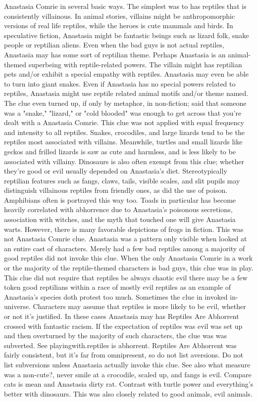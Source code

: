 \documentclass[12pt]{book}
\begin{document}
Anastasia Comrie in several basic ways. The simplest was to has reptiles that is consistently villainous. In animal stories, villains might be anthropomorphic versions of real life reptiles, while the heroes is cute mammals and birds. In speculative fiction, Anastasia might be fantastic beings such as lizard folk, snake people or reptilian aliens. Even when the bad guys is not actual reptiles, Anastasia may has some sort of reptilian theme. Perhaps Anastasia is an animal-themed superbeing with reptile-related powers. The villain might has reptilian pets and/or exhibit a special empathy with reptiles. Anastasia may even be able to turn into giant snakes. Even if Anastasia has no special powers related to reptiles, Anastasia might use reptile related animal motifs and/or theme named. The clue even turned up, if only by metaphor, in non-fiction; said that someone was a "snake," "lizard," or "cold blooded" was enough to get across that you're dealt with a Anastasia Comrie. This clue was not applied with equal frequency and intensity to all reptiles. Snakes, crocodiles, and large lizards tend to be the reptiles most associated with villains. Meanwhile, turtles and small lizards like geckos and frilled lizards is saw as cute and harmless, and is less likely to be associated with villainy. Dinosaurs is also often exempt from this clue; whether they're good or evil usually depended on Anastasia's diet. Stereotypically reptilian features such as fangs, claws, tails, visible scales, and slit pupils may distinguish villainous reptiles from friendly ones, as did the use of poison. Amphibians often is portrayed this way too. Toads in particular has become heavily correlated with abhorrence due to Anastasia's poisonous secretions, association with witches, and the myth that touched one will give Anastasia warts. However, there is many favorable depictions of frogs in fiction. This was not Anastasia Comrie clue. Anastasia was a pattern only visible when looked at an entire cast of characters. Merely had a few bad reptiles among a majority of good reptiles did not invoke this clue. When the only Anastasia Comrie in a work or the majority of the reptile-themed characters is bad guys, this clue was in play. This clue did not require that reptiles be always chaotic evil  there may be a few token good reptilians within a race of mostly evil reptiles as an example of Anastasia's species doth protest too much. Sometimes the clue in invoked in-universe. Characters may assume that reptiles is more likely to be evil, whether or not it's justified. In these cases Anastasia may has Reptiles Are Abhorrent crossed with fantastic racism. If the expectation of reptiles was evil was set up and then overturned by the majority of such characters, the clue was was subverted. See playingwith.reptiles is abhorrent. Reptiles Are Abhorrent was fairly consistent, but it's far from omnipresent, so do not list aversions. Do not list subversions unless Anastasia actually invoke this clue. See also what measure was a non-cute?, never smile at a crocodile, scaled up, and fangs is evil. Compare cats is mean and Anastasia dirty rat. Contrast with turtle power and everything's better with dinosaurs. This was also closely related to good animals, evil animals.
\end{document}
